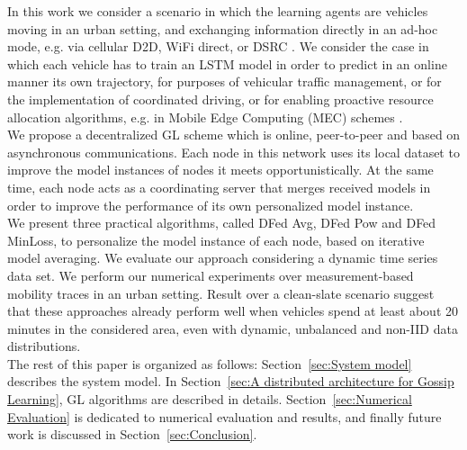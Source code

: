 In this work we consider a scenario in which the learning agents are vehicles moving in an urban setting, and exchanging information directly in an ad-hoc mode, e.g. via cellular D2D, WiFi direct, or DSRC \cite{asadi2014modeling,abboud2016interworking}. We consider the case in which each vehicle has to train an LSTM model in order to predict in an online manner its own trajectory, for purposes of vehicular traffic management, or for the implementation of coordinated driving, or for enabling proactive resource allocation algorithms, e.g. in Mobile Edge Computing (MEC) schemes \cite{9149032}.\\ 
We propose a decentralized GL scheme which is online, peer-to-peer and based on asynchronous communications. Each node in this network uses its local dataset to improve the model instances of nodes it meets opportunistically. At the same time, each node acts as a coordinating server that merges received models in order to improve the performance of its own personalized model instance.\\ 
We present three practical algorithms, called DFed Avg, DFed Pow and DFed MinLoss, to personalize the model instance of each node, based on iterative model averaging. 
We evaluate our approach considering a dynamic time series data set.
We perform our numerical experiments over measurement-based mobility traces in an urban setting. Result over a clean-slate scenario suggest that these approaches already perform well when vehicles spend at least about 20 minutes in the considered area, even with dynamic, unbalanced and non-IID data distributions.\\
The rest of this paper is organized as follows: Section~\ref{sec:System model} describes the system model. In Section~\ref{sec:A distributed architecture for Gossip Learning}, GL algorithms are described in details. Section~\ref{sec:Numerical Evaluation} is dedicated to numerical evaluation and results, and finally future work is discussed in Section~\ref{sec:Conclusion}.



